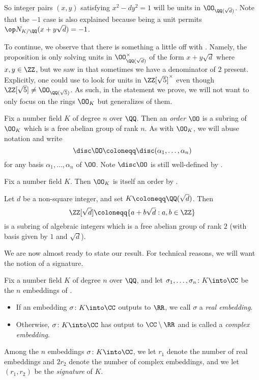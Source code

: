 \documentclass[../notes.tex]{subfiles}
\begin{document}
So integer pairs $(x,y)$ satisfying $x^2-dy^2=1$ will be units in $\OO_{\QQ(\sqrt d)}$. Note that the $-1$ case is also explained  because being a unit permits $\op N_{K/\QQ}(x+y\sqrt d)=-1$.

To continue, we observe that there is something a little off with . Namely, the proposition is only solving units in $\OO_{\QQ(\sqrt d)}^\times$ of the form $x+y\sqrt d$ where $x,y\in\ZZ$, but we saw in  that sometimes we have a denominator of $2$ present. Explicitly, one could use  to look for units in $\ZZ[\sqrt 5]^\times$ even though $\ZZ[\sqrt 5]\ne\OO_{\QQ(\sqrt5)}$. As such, in the statement we prove, we will not want to only focus on the rings $\OO_K$ but generalizes of them.
\begin{definition}[order]
	Fix a number field $K$ of degree $n$ over $\QQ$. Then an \textit{order} $\OO$ is a subring of $\OO_K$ which is a free abelian group of rank $n$. As with $\OO_K$, we will abuse notation and write
	\[\disc\OO\coloneqq\disc(\alpha_1,\ldots,\alpha_n)\]
	for any basis $\alpha_1,\ldots,\alpha_n$ of $\OO$. Note $\disc\OO$ is still well-defined by .
\end{definition}
\begin{example}
	Fix a number field $K$. Then $\OO_K$ is itself an order by .
\end{example}
\begin{example}
	Let $d$ be a non-square integer, and set $K\coloneqq\QQ(\sqrt d)$. Then
	\[\ZZ[\sqrt d]\coloneqq\{a+b\sqrt d:a,b\in\ZZ\}\]
	is a subring of algebraic integers which is a free abelian group of rank $2$ (with basis given by $1$ and $\sqrt d$).
\end{example}
We are now almost ready to state our result. For technical reasons, we will want the notion of a signature. 
\begin{definition}[signature]
	Fix a number field $K$ of degree $n$ over $\QQ$, and let $\sigma_1,\ldots,\sigma_n\colon K\into\CC$ be the $n$ embeddings of .
	\begin{itemize}
		\item If an embedding $\sigma\colon K\into\CC$ outputs to $\RR$, we call $\sigma$ a \textit{real embedding}.
		\item Otherwise, $\sigma\colon K\into\CC$ has output to $\CC\setminus\RR$ and is called a \textit{complex embedding}.
	\end{itemize}
	Among the $n$ embeddings $\sigma\colon K\into\CC$, we let $r_1$ denote the number of real embeddings and $2r_2$ denote the number of complex embeddings, and we let $(r_1,r_2)$ be the \textit{signature} of $K$.
\end{definition}
\end{document}
